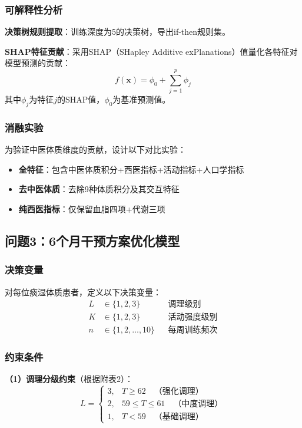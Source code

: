 \documentclass[12pt,a4paper]{ctexart}
\begin{document}
\subsubsection{可解释性分析}

\textbf{决策树规则提取}：训练深度为5的决策树，导出if-then规则集。

\textbf{SHAP特征贡献}：采用SHAP（SHapley Additive exPlanations）值量化各特征对模型预测的贡献：
\begin{equation}
    f(\mathbf{x}) = \phi_0 + \sum_{j=1}^{p}\phi_j
\end{equation}
其中$\phi_j$为特征$j$的SHAP值，$\phi_0$为基准预测值。

\subsubsection{消融实验}

为验证中医体质维度的贡献，设计以下对比实验：
\begin{itemize}
    \item \textbf{全特征}：包含中医体质积分+西医指标+活动指标+人口学指标
    \item \textbf{去中医体质}：去除9种体质积分及其交互特征
    \item \textbf{纯西医指标}：仅保留血脂四项+代谢三项
\end{itemize}

\subsection{问题3：6个月干预方案优化模型}

\subsubsection{决策变量}

对每位痰湿体质患者，定义以下决策变量：
\begin{align}
    L &\in \{1,2,3\} && \text{调理级别} \\
    K &\in \{1,2,3\} && \text{活动强度级别} \\
    n &\in \{1,2,\dots,10\} && \text{每周训练频次}
\end{align}

\subsubsection{约束条件}

\textbf{（1）调理分级约束}（根据附表2）：
\begin{equation}
    L = \begin{cases}
        3, & T \geq 62 \quad \text{（强化调理）} \\
        2, & 59 \leq T \leq 61 \quad \text{（中度调理）} \\
        1, & T < 59 \quad \text{（基础调理）}
    \end{cases}
\end{equation}
\end{document}
